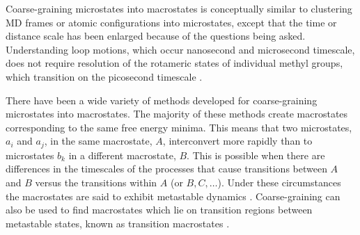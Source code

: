 Coarse-graining microstates into macrostates is conceptually similar to clustering MD frames or atomic configurations into microstates, except that the time or distance scale has been enlarged because of the questions being asked. Understanding loop motions, which occur nanosecond and microsecond timescale, does not require resolution of the rotameric states of individual methyl groups, which transition on the picosecond timescale \cite{henzler-wildmanDynamicPersonalitiesProteins2007}.


There have been a wide variety of methods developed for coarse-graining microstates into macrostates. The majority of these methods create macrostates corresponding to the same free energy minima. This means that two microstates, $a_{i}$ and $a_{j}$, in the same macrostate, $A$, interconvert more rapidly than to microstates $b_{k}$ in a different macrostate, $B$.  This is possible when there are differences in the timescales of the processes that cause transitions between $A$ and $B$ versus the transitions within $A$ (or $B, C, \ldots$). Under these circumstances the macrostates are said to exhibit metastable dynamics \cite{noeProjectedHiddenMarkov2013a}.  Coarse-graining can also be used to find macrostates which lie on transition regions between metastable states, known as transition macrostates \cite{martiniVariationalIdentificationMarkovian2017}.  

